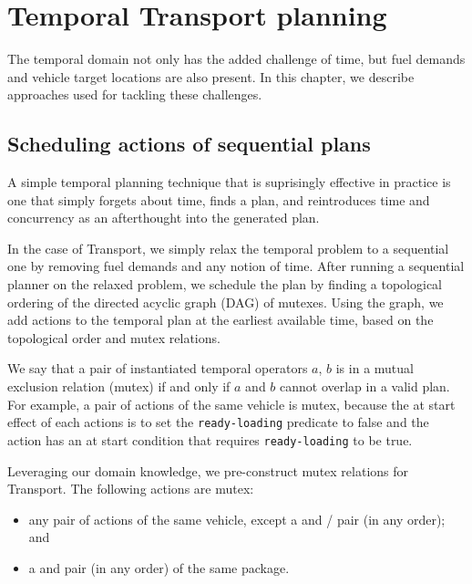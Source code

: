 \chapter{Temporal Transport planning}

The temporal domain not only has the added challenge of time,
but fuel demands and vehicle target locations are also present.
In this chapter, we describe approaches used
for tackling these challenges.















\section{Scheduling actions of sequential plans}\label{sched}

A simple temporal planning
technique that is suprisingly effective in practice
is one that simply forgets about time,
finds a plan, and reintroduces time and concurrency as an afterthought
into the generated plan.

In the case of Transport, we simply relax the temporal
problem to a sequential one by removing fuel demands
and any notion of time.
After running a sequential planner on the relaxed problem,
we schedule the plan by finding a
topological ordering of the directed acyclic graph (DAG)
of mutexes. Using the graph, we add actions to the temporal plan
at the earliest available time, based on the topological
order and mutex relations.

We say that a pair of instantiated temporal operators $a$, $b$
is in a mutual exclusion relation (mutex)
if and only if $a$ and $b$
cannot overlap in a valid plan.
For example, a pair of \pickup{} actions 
of the same vehicle is mutex, because the
at start effect of each actions is to 
set the \verb+ready-loading+
predicate to false and the action has an at start
condition that requires \verb+ready-loading+
to be true.

Leveraging our domain knowledge, we pre-construct mutex relations for Transport. The following actions are mutex:
\begin{itemize}
\item any pair of actions
of the same vehicle, except a  and \pickup{}/\drop{} pair (in any order); and
\item a \drop{} and \pickup{} pair (in any order)
of the same package.
\end{itemize}

